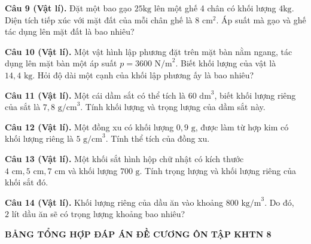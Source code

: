 \documentclass{article}
\begin{document}
\fontsize{25}{33}\selectfont
\textbf{Câu 9 (Vật lí).} Đặt một bao gạo $25\text{kg}$ lên một ghế 4 chân có khối lượng $4\text{kg}$. Diện tích tiếp xúc với mặt đất của mỗi chân ghế là $8\text{ cm}^2$. Áp suất mà gạo và ghế tác dụng lên mặt đất là bao nhiêu?
\vspace*{\fill}
\newpage

\fontsize{25}{33}\selectfont
\textbf{Câu 10 (Vật lí).} Một vật hình lập phương đặt trên mặt bàn nằm ngang, tác dụng lên mặt bàn một áp suất $p = 3600\text{ N/m}^2$. Biết khối lượng của vật là $14,4\text{ kg}$. Hỏi độ dài một cạnh của khối lập phương ấy là bao nhiêu?
\vspace*{\fill}
\newpage

\fontsize{25}{33}\selectfont
\textbf{Câu 11 (Vật lí).} Một cái dầm sắt có thể tích là $60\text{ dm}^3$, biết khối lượng riêng của sắt là $7,8\text{ g/cm}^3$. Tính khối lượng và trọng lượng của dầm sắt này.
\vspace*{\fill}
\newpage

\fontsize{26}{34}\selectfont
\textbf{Câu 12 (Vật lí).} Một đồng xu có khối lượng $0,9\text{ g}$, được làm từ hợp kim có khối lượng riêng là $5\text{ g/cm}^3$. Tính thể tích của đồng xu.
\vspace*{\fill}
\newpage

\fontsize{25}{33}\selectfont
\textbf{Câu 13 (Vật lí).} Một khối sắt hình hộp chữ nhật có kích thước $4\text{ cm}, 5\text{ cm}, 7\text{ cm}$ và khối lượng $700\text{ g}$. Tính trọng lượng và khối lượng riêng của khối sắt đó.
\vspace*{\fill}
\newpage

\fontsize{26}{34}\selectfont
\textbf{Câu 14 (Vật lí).} Khối lượng riêng của dầu ăn vào khoảng $800\text{ kg/m}^3$. Do đó, $2\text{ lít}$ dầu ăn sẽ có trọng lượng khoảng bao nhiêu?
\vspace*{\fill}
\newpage

\begin{center}
{\fontsize{24}{30}\selectfont \textbf{\color{brandGreen}BẢNG TỔNG HỢP ĐÁP ÁN ĐỀ CƯƠNG ÔN TẬP KHTN 8}}\\[0.4cm]
\end{center}
\end{document}
